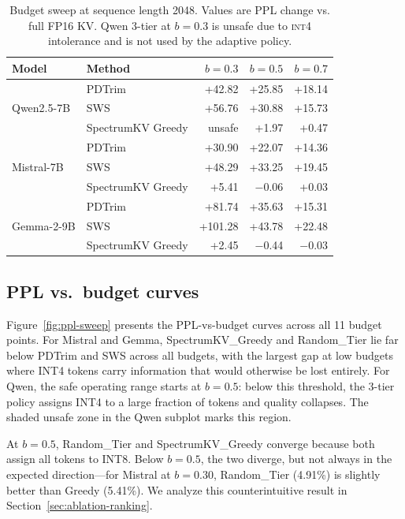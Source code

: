\documentclass[11pt]{article}
\newcommand{\method}{SpectrumKV}
\newcommand{\budget}{b}
\newcommand{\pct}{\%}
\newcommand{\intiv}{\textsc{int4}}
\theoremstyle{plain}
\theoremstyle{definition}
\begin{document}
\begin{table}[t]
\centering
\caption{Budget sweep at sequence length 2048.  Values are PPL change vs. full FP16 KV.  Qwen 3-tier at $\budget=0.3$ is unsafe due to \intiv{} intolerance and is not used by the adaptive policy.}
\label{tab:budget}
\small
\begin{tabular}{llrrr}
\toprule
Model & Method & $\budget=0.3$ & $\budget=0.5$ & $\budget=0.7$ \\
\midrule
\multirow{3}{*}{Qwen2.5-7B}
  & PDTrim & +42.82 & +25.85 & +18.14 \\
  & SWS & +56.76 & +30.88 & +15.73 \\
  & \method{} Greedy & unsafe & +1.97 & +0.47 \\
\midrule
\multirow{3}{*}{Mistral-7B}
  & PDTrim & +30.90 & +22.07 & +14.36 \\
  & SWS & +48.29 & +33.25 & +19.45 \\
  & \method{} Greedy & +5.41 & $-$0.06 & +0.03 \\
\midrule
\multirow{3}{*}{Gemma-2-9B}
  & PDTrim & +81.74 & +35.63 & +15.31 \\
  & SWS & +101.28 & +43.78 & +22.48 \\
  & \method{} Greedy & +2.45 & $-$0.44 & $-$0.03 \\
\bottomrule
\end{tabular}
\end{table}

\subsection{PPL vs.\ budget curves}
\label{sec:ppl-curves}

Figure~\ref{fig:ppl-sweep} presents the PPL-vs-budget curves across all 11 budget points.  For Mistral and Gemma, \method{}\_Greedy and Random\_Tier lie far below PDTrim and SWS across all budgets, with the largest gap at low budgets where INT4 tokens carry information that would otherwise be lost entirely.  For Qwen, the safe operating range starts at $\budget=0.5$: below this threshold, the 3-tier policy assigns INT4 to a large fraction of tokens and quality collapses.  The shaded unsafe zone in the Qwen subplot marks this region.

At $\budget=0.5$, Random\_Tier and \method{}\_Greedy converge because both assign all tokens to INT8.  Below $\budget=0.5$, the two diverge, but not always in the expected direction---for Mistral at $\budget=0.30$, Random\_Tier (4.91\pct{}) is slightly better than Greedy (5.41\pct{}).  We analyze this counterintuitive result in Section~\ref{sec:ablation-ranking}.
\end{document}
